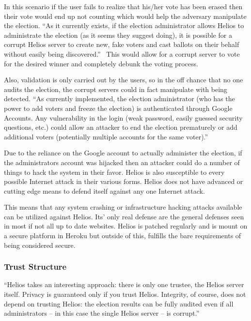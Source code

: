 In this scenario if the user fails to realize that his/her vote has
been erased then their vote would end up not counting which would help
the adversary manipulate the election. ``As it currently exists, if
the election administrator allows Helios to administrate the election
(as it seems they suggest doing), it is possible for a corrupt Helios
server to create new, fake voters and cast ballots on their behalf
without easily being discovered.''~\cite{orion2009} This would allow
for a corrupt server to vote for the desired winner and completely
debunk the voting process.

Also, validation is only carried out by the users, so in the off
chance that no one audits the election, the corrupt servers could in
fact manipulate with being detected. ``As currently implemented, the
election administrator (who has the power to add voters and freeze the
election) is authenticated through Google Accounts. Any vulnerability
in the login (weak password, easily guessed security questions, etc.)
could allow an attacker to end the election prematurely or add
additional voters (potentially multiple accounts for the same
voter).''~\cite{orion2009}

Due to the reliance on the Google account to actually administer the
election, if the administrators account was hijacked then an attacker
could do a number of things to hack the system in their favor. Helios
is also susceptible to every possible Internet attack in their various
forms. Helios does not have advanced or cutting edge means to defend
itself against any one Internet attack.

This means that any system crashing or infrastructure hacking attacks
available can be utilized against Helios. Its' only real defense are
the general defenses seen in most if not all up to date
websites. Helios is patched regularly and is mount on a secure
platform in Heroku but outside of this, fulfills the bare requirements
of being considered secure.

\subsubsection{Trust Structure}

``Helios takes an interesting approach: there is only one trustee, the
Helios server itself. Privacy is guaranteed only if you trust
Helios. Integrity, of course, does not depend on trusting Helios: the
election results can be fully audited even if all administrators -- in
this case the single Helios server -- is corrupt.''~\cite{adida2008}

